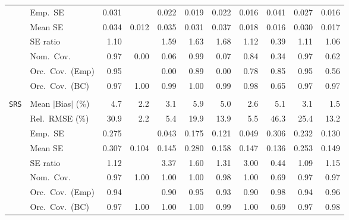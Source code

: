 \begin{landscape}
\begin{longtable}{llrrrrrrrrr}
 & Emp.\ SE & 0.031 &  & 0.022 & 0.019 & 0.022 & 0.016 & 0.041 & 0.027 & 0.016 \\
 & Mean SE & 0.034 & 0.012 & 0.035 & 0.031 & 0.037 & 0.018 & 0.016 & 0.030 & 0.017 \\
 & SE ratio & \cellcolor{ranktwo}1.10 &  & 1.59 & 1.63 & 1.68 & 1.12 & 0.39 & \cellcolor{rankthree}1.11 & \cellcolor{rankone}1.06 \\
 & Nom.\ Cov. & \cellcolor{rankone}0.97 & 0.00 & 0.06 & \cellcolor{ranktwo}0.99 & 0.07 & \cellcolor{rankthree}0.84 & 0.34 & \cellcolor{rankone}0.97 & 0.62 \\
 & Orc.\ Cov.\ (Emp) & \cellcolor{rankone}0.95 &  & 0.00 & \cellcolor{ranktwo}0.89 & 0.00 & 0.78 & \cellcolor{rankthree}0.85 & \cellcolor{rankone}0.95 & 0.56 \\
 & Orc.\ Cov.\ (BC) & \cellcolor{rankone}0.97 & 1.00 & \cellcolor{rankthree}0.99 & 1.00 & \cellcolor{rankthree}0.99 & \cellcolor{ranktwo}0.98 & 0.65 & \cellcolor{rankone}0.97 & \cellcolor{rankone}0.97 \\
\addlinespace[2pt]
\multicolumn{11}{l}{\textbf{Binary \& Categorical Phase-One Covariates}} \\
\addlinespace[2pt]
\quad \texttt{SRS} & Mean $|$Bias$|$ (\%) & 4.7 & \cellcolor{ranktwo}2.2 & 3.1 & 5.9 & 5.0 & \cellcolor{rankthree}2.6 & 5.1 & 3.1 & \cellcolor{rankone}1.5 \\
 & Rel.\ RMSE (\%) & 30.9 & \cellcolor{rankone}2.2 & \cellcolor{ranktwo}5.4 & 19.9 & 13.9 & \cellcolor{rankthree}5.5 & 46.3 & 25.4 & 13.2 \\
 & Emp.\ SE & 0.275 &  & 0.043 & 0.175 & 0.121 & 0.049 & 0.306 & 0.232 & 0.130 \\
 & Mean SE & 0.307 & 0.104 & 0.145 & 0.280 & 0.158 & 0.147 & 0.136 & 0.253 & 0.149 \\
 & SE ratio & \cellcolor{ranktwo}1.12 &  & 3.37 & 1.60 & 1.31 & 3.00 & 0.44 & \cellcolor{rankone}1.09 & \cellcolor{rankthree}1.15 \\
 & Nom.\ Cov. & \cellcolor{rankone}0.97 & \cellcolor{rankthree}1.00 & \cellcolor{rankthree}1.00 & \cellcolor{rankthree}1.00 & \cellcolor{ranktwo}0.98 & \cellcolor{rankthree}1.00 & 0.69 & \cellcolor{rankone}0.97 & \cellcolor{rankone}0.97 \\
 & Orc.\ Cov.\ (Emp) & \cellcolor{ranktwo}0.94 &  & 0.90 & \cellcolor{rankone}0.95 & \cellcolor{rankthree}0.93 & 0.90 & 0.98 & \cellcolor{ranktwo}0.94 & \cellcolor{ranktwo}0.96 \\
 & Orc.\ Cov.\ (BC) & \cellcolor{rankone}0.97 & 1.00 & 1.00 & 1.00 & \cellcolor{rankthree}0.99 & 1.00 & 0.69 & \cellcolor{rankone}0.97 & \cellcolor{ranktwo}0.98 \\

\end{longtable}
\end{landscape}
